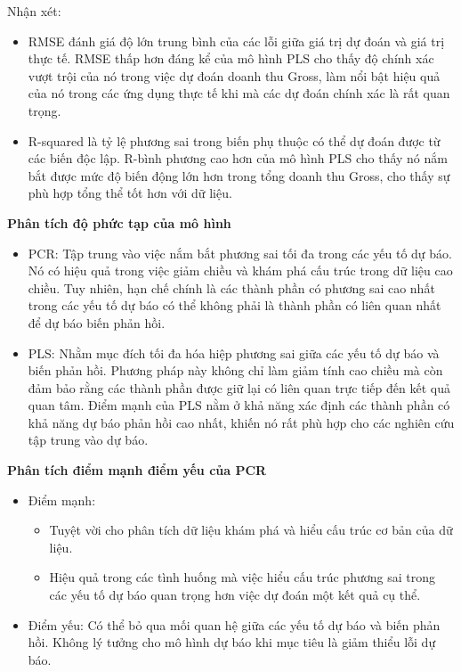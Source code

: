 Nhận xét:
\begin{itemize}
    \item RMSE đánh giá độ lớn trung bình của các lỗi giữa giá trị dự đoán và giá trị thực tế. RMSE thấp hơn đáng kể của mô hình PLS cho thấy độ chính xác vượt trội của nó trong việc dự đoán doanh thu Gross, làm nổi bật hiệu quả của nó trong các ứng dụng thực tế khi mà các dự đoán chính xác là rất quan trọng.
    \item R-squared là tỷ lệ phương sai trong biến phụ thuộc có thể dự đoán được từ các biến độc lập. R-bình phương cao hơn của mô hình PLS cho thấy nó nắm bắt được mức độ biến động lớn hơn trong tổng doanh thu Gross, cho thấy sự phù hợp tổng thể tốt hơn với dữ liệu.
\end{itemize}

\textbf{Phân tích độ phức tạp của mô hình}
\begin{itemize}
    \item PCR: Tập trung vào việc nắm bắt phương sai tối đa trong các yếu tố dự báo. Nó có hiệu quả trong việc giảm chiều và khám phá cấu trúc trong dữ liệu cao chiều. Tuy nhiên, hạn chế chính là các thành phần có phương sai cao nhất trong các yếu tố dự báo có thể không phải là thành phần có liên quan nhất để dự báo biến phản hồi.
    \item PLS: Nhằm mục đích tối đa hóa hiệp phương sai giữa các yếu tố dự báo và biến phản hồi. Phương pháp này không chỉ làm giảm tính cao chiều mà còn đảm bảo rằng các thành phần được giữ lại có liên quan trực tiếp đến kết quả quan tâm. Điểm mạnh của PLS nằm ở khả năng xác định các thành phần có khả năng dự báo phản hồi cao nhất, khiến nó rất phù hợp cho các nghiên cứu tập trung vào dự báo.
\end{itemize}

\textbf{Phân tích điểm mạnh điểm yếu của PCR}
\begin{itemize}
    \item Điểm mạnh:
    \begin{itemize}
        \item Tuyệt vời cho phân tích dữ liệu khám phá và hiểu cấu trúc cơ bản của dữ liệu.
        \item Hiệu quả trong các tình huống mà việc hiểu cấu trúc phương sai trong các yếu tố dự báo quan trọng hơn việc dự đoán một kết quả cụ thể.
    \end{itemize}
    \item Điểm yếu: Có thể bỏ qua mối quan hệ giữa các yếu tố dự báo và biến phản hồi.
Không lý tưởng cho mô hình dự báo khi mục tiêu là giảm thiểu lỗi dự báo.
\end{itemize}

